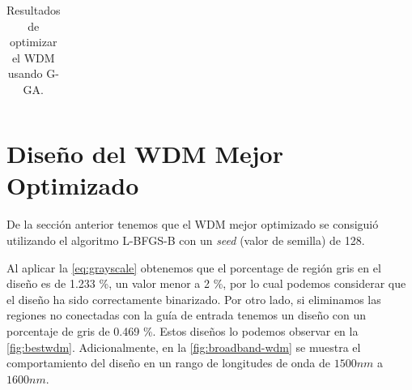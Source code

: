 \begin{landscape}
\begin{table}[ht]
\begin{tabular}{|c|c|c|c|}
    \hline
    \end{tabular}
    \hspace*{-5cm}
    \caption{Resultados de optimizar el WDM usando G-GA.}
    \label{tab:opt-GA-wdm}
\end{table}
\end{landscape}

\section{Diseño del WDM Mejor Optimizado}\label{sec:best-wdm}

De la sección anterior tenemos que el WDM mejor optimizado se consiguió
utilizando el algoritmo L-BFGS-B con un \emph{seed} (valor de semilla) de 128.

Al aplicar la \autoref{eq:grayscale} obtenemos que el porcentage de región gris en el diseño
es de 1.233 \%, un valor menor a 2 \%, por lo cual podemos considerar que el diseño ha sido
correctamente binarizado. Por otro lado, si eliminamos las regiones no conectadas con la guía de entrada
tenemos un diseño con un porcentaje de gris de 0.469 \%.
Estos diseños lo podemos observar en la \autoref{fig:bestwdm}.
Adicionalmente, en la \autoref{fig:broadband-wdm} se muestra el comportamiento del diseño
en un rango de longitudes de onda de $1500nm$ a $1600 nm$.

